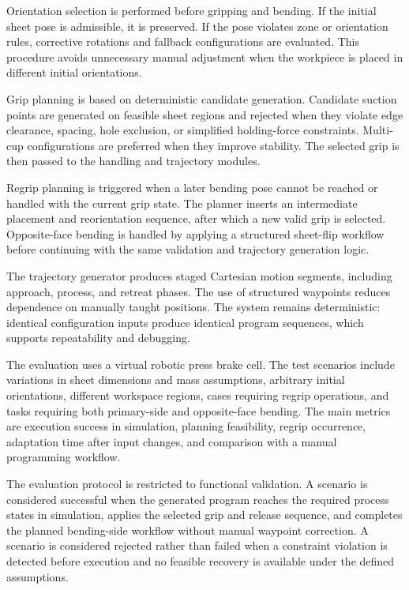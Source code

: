 \documentclass[journal]{IEEEtran}
\begin{document}
Orientation selection is performed before gripping and bending. If the initial sheet pose is admissible, it is preserved. If the pose violates zone or orientation rules, corrective rotations and fallback configurations are evaluated. This procedure avoids unnecessary manual adjustment when the workpiece is placed in different initial orientations.

Grip planning is based on deterministic candidate generation. Candidate suction points are generated on feasible sheet regions and rejected when they violate edge clearance, spacing, hole exclusion, or simplified holding-force constraints. Multi-cup configurations are preferred when they improve stability. The selected grip is then passed to the handling and trajectory modules.

Regrip planning is triggered when a later bending pose cannot be reached or handled with the current grip state. The planner inserts an intermediate placement and reorientation sequence, after which a new valid grip is selected. Opposite-face bending is handled by applying a structured sheet-flip workflow before continuing with the same validation and trajectory generation logic.

The trajectory generator produces staged Cartesian motion segments, including approach, process, and retreat phases. The use of structured waypoints reduces dependence on manually taught positions. The system remains deterministic: identical configuration inputs produce identical program sequences, which supports repeatability and debugging.

The evaluation uses a virtual robotic press brake cell. The test scenarios include variations in sheet dimensions and mass assumptions, arbitrary initial orientations, different workspace regions, cases requiring regrip operations, and tasks requiring both primary-side and opposite-face bending. The main metrics are execution success in simulation, planning feasibility, regrip occurrence, adaptation time after input changes, and comparison with a manual programming workflow.

The evaluation protocol is restricted to functional validation. A scenario is considered successful when the generated program reaches the required process states in simulation, applies the selected grip and release sequence, and completes the planned bending-side workflow without manual waypoint correction. A scenario is considered rejected rather than failed when a constraint violation is detected before execution and no feasible recovery is available under the defined assumptions.
\end{document}
